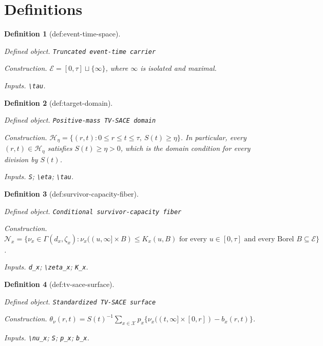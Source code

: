 \documentclass{article}
\newtheorem{definition}{Definition}
\begin{document}
\section{Definitions}

\begin{definition}[def:event-time-space]\label{def:event-time-space}
\par\smallskip\noindent\emph{Defined object.} \texttt{Truncated event-\allowbreak{}time carrier}
\par\smallskip\noindent\emph{Construction.} \(\mathcal E=[0,\tau]\sqcup\{\infty\}\), where \(\infty\) is isolated and maximal.
\par\smallskip\noindent\emph{Inputs.} \texttt{\textbackslash{}\allowbreak{}tau}.
\end{definition}

\begin{definition}[def:target-domain]\label{def:target-domain}
\par\smallskip\noindent\emph{Defined object.} \texttt{Positive-\allowbreak{}mass TV-\allowbreak{}SACE domain}
\par\smallskip\noindent\emph{Construction.} \(\mathcal H_\eta=\{(r,t):0\leq r\leq t\leq\tau,\ S(t)\geq\eta\}\).  In particular, every \((r,t)\in\mathcal H_\eta\) satisfies \(S(t)\geq\eta>0\), which is the domain condition for every division by \(S(t)\).
\par\smallskip\noindent\emph{Inputs.} \texttt{S}; \texttt{\textbackslash{}\allowbreak{}eta}; \texttt{\textbackslash{}\allowbreak{}tau}.
\end{definition}

\begin{definition}[def:survivor-capacity-fiber]\label{def:survivor-capacity-fiber}
\par\smallskip\noindent\emph{Defined object.} \texttt{Conditional survivor-\allowbreak{}capacity fiber}
\par\smallskip\noindent\emph{Construction.} \(\mathcal N_x=\{\nu_x\in\Gamma(d_x,\zeta_x):\nu_x((u,\infty]\times B)\le K_x(u,B)\text{ for every }u\in[0,\tau]\text{ and every Borel }B\subseteq\mathcal E\}\).
\par\smallskip\noindent\emph{Inputs.} \texttt{d\_\allowbreak{}x}; \texttt{\textbackslash{}\allowbreak{}zeta\_\allowbreak{}x}; \texttt{K\_\allowbreak{}x}.
\end{definition}

\begin{definition}[def:tv-sace-surface]\label{def:tv-sace-surface}
\par\smallskip\noindent\emph{Defined object.} \texttt{Standardized TV-\allowbreak{}SACE surface}
\par\smallskip\noindent\emph{Construction.} \(\theta_\nu(r,t)=S(t)^{-1}\sum_{x\in\mathcal X}p_x\{\nu_x((t,\infty]\times[0,r])-b_x(r,t)\}\).
\par\smallskip\noindent\emph{Inputs.} \texttt{\textbackslash{}\allowbreak{}nu\_\allowbreak{}x}; \texttt{S}; \texttt{p\_\allowbreak{}x}; \texttt{b\_\allowbreak{}x}.
\end{definition}
\end{document}
